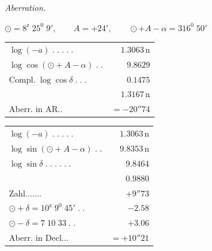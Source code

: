 \begin{center}
\textit{Aberration.}\par\medskip
$\odot=8^{\mathrm z}\;25^0\;9',\qquad A=+24',\qquad \odot+A-\alpha=316^0\;50'$
\par\medskip
\begin{minipage}[t]{.48\textwidth}\centering\footnotesize
\begin{tabular}[t]{@{}lr@{}}
$\log(-a)\;.\;.\;.\;.\;.$&$1.3063\,\mathrm n$\\
$\log\cos(\odot+A-\alpha)\;.\;.$&$9.8629$\\
$\text{Compl.}\;\log\cos\delta\;.\;.\;.$&$0.1475$\\\hline
&$1.3167\,\mathrm n$\\
Aberr. in AR.\;.&$=-20''74$
\end{tabular}
\end{minipage}\hfill
\begin{minipage}[t]{.49\textwidth}\centering\footnotesize
\begin{tabular}[t]{@{}lr@{}}
$\log(-a)\;.\;.\;.\;.\;.$&$1.3063\,\mathrm n$\\
$\log\sin(\odot+A-\alpha)\;.\;.$&$9.8353\,\mathrm n$\\
$\log\sin\delta\;.\;.\;.\;.\;.\;.$&$9.8464$\\\hline
&$0.9880$\\
Zahl\;.\;.\;.\;.\;.\;.\;.&$+9''73$\\
$\odot+\delta=10^{\mathrm z}\;9^0\;45'\;.\;.$&$-2.58$\\
$\odot-\delta=7\;10\;33\;.\;.$&$+3.06$\\\hline
Aberr. in Decl.\;.\;.&$=+10''21$
\end{tabular}
\end{minipage}
\end{center}
\clearpage{}
